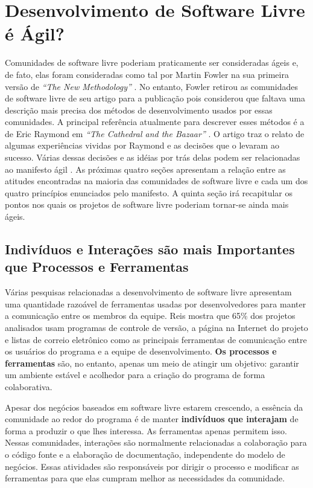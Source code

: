 \chapter{Desenvolvimento de Software Livre é Ágil?}
\label{cap:foss}

Comunidades de software livre poderiam praticamente ser consideradas
ágeis e, de fato, elas foram consideradas como tal por Martin Fowler
na sua primeira versão de \emph{``The New Methodology''}
\cite{Fowler00orig}. No entanto, Fowler retirou as comunidades de
software livre de seu artigo para a publicação pois considerou que
faltava uma descrição mais precisa dos métodos de desenvolvimento
usados por essas comunidades. A principal referência atualmente para
descrever esses métodos é a de Eric Raymond em \emph{``The Cathedral
  and the Bazaar''} \cite{Raymond1999}. O artigo traz o relato de
algumas experiências vividas por Raymond e as decisões que o levaram
ao sucesso. Várias dessas decisões e as idéias por trás delas podem
ser relacionadas ao manifesto ágil \cite{AgileManifesto}. As próximas
quatro seções apresentam a relação entre as atitudes encontradas na
maioria das comunidades de software livre e cada um dos quatro
princípios enunciados pelo manifesto. A quinta seção irá recapitular
os pontos nos quais os projetos de software livre poderiam tornar-se
ainda mais ágeis.

\section{Indivíduos e Interações são mais Importantes que Processos e
  Ferramentas}
\label{sec:first-princ}

Várias pesquisas relacionadas a desenvolvimento de software livre
apresentam uma quantidade razoável de ferramentas usadas por
desenvolvedores para manter a comunicação entre os membros da
equipe. Reis \cite{Reis2003} mostra que 65\% dos projetos analisados
usam programas de controle de versão, a página na Internet do projeto
e listas de correio eletrônico como as principais ferramentas de
comunicação entre os usuários do programa e a equipe de
desenvolvimento. \textbf{Os processos e ferramentas} são, no entanto,
apenas um meio de atingir um objetivo: garantir um ambiente estável e
acolhedor para a criação do programa de forma colaborativa.

Apesar dos negócios baseados em software livre estarem crescendo, a
essência da comunidade ao redor do programa é de manter
\textbf{indivíduos que interajam} de forma a produzir o que lhes
interessa. As ferramentas apenas permitem isso. Nessas comunidades,
interações são normalmente relacionadas a colaboração para o código
fonte e a elaboração de documentação, independente do modelo de
negócios. Essas atividades são responsáveis por dirigir o processo e
modificar as ferramentas para que elas cumpram melhor as necessidades
da comunidade.

